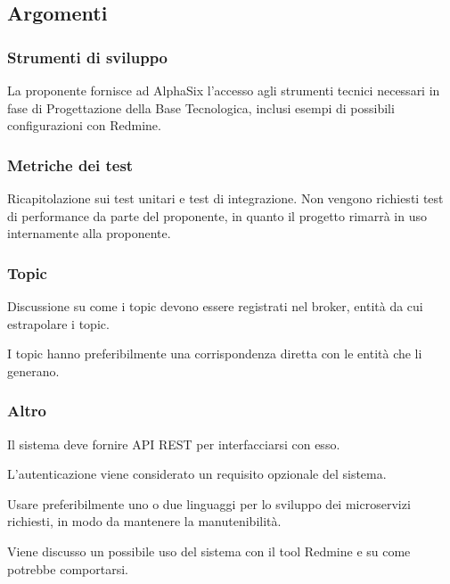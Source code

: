         \subsection{Argomenti}
            \subsubsection{Strumenti di sviluppo}
            La proponente fornisce ad AlphaSix l'accesso agli strumenti tecnici necessari in fase di Progettazione della Base Tecnologica, inclusi esempi di possibili configurazioni con Redmine.

            \subsubsection{Metriche dei test}
            Ricapitolazione sui test unitari e test di integrazione. Non vengono richiesti test di performance da parte del proponente, in quanto il progetto rimarrà in uso internamente alla proponente.
            
            \subsubsection{Topic}
            Discussione su come i topic devono essere registrati nel broker, entità da cui estrapolare i topic.\par
            I topic hanno preferibilmente una corrispondenza diretta con le entità che li generano.            
            
            \subsubsection{Altro}
            Il sistema deve fornire API REST per interfacciarsi con esso.\par
            L'autenticazione viene considerato un requisito opzionale del sistema.\par
            Usare preferibilmente uno o due linguaggi per lo sviluppo dei microservizi richiesti, in modo da mantenere la manutenibilità.\par
            Viene discusso un possibile uso del sistema con il tool Redmine e su come potrebbe comportarsi.


